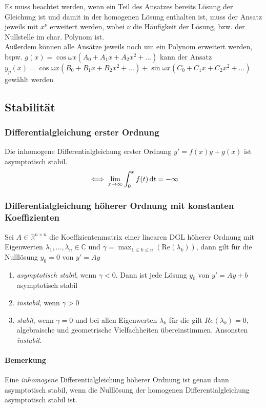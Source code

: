 Es muss beachtet werden, wenn ein Teil des Ansatzes bereits Lösung der Gleichung ist und damit in der homogenen Lösung enthalten ist, muss der Ansatz jeweils mit $x^\nu$ erweitert werden, wobei $\nu$ die Häufigkeit der Lösung, bzw. der Nullstelle im char. Polynom ist.\\
Außerdem können alle Ansätze jeweils noch um ein Polynom erweitert werden, bspw. $g(x)=\cos{\omega x}(A_0+A_1x+A_2x^2+\dots)$ kann der Ansatz\\ $y_p(x)=\cos{\omega x}(B_0+B_1x+B_2x^2+\dots)+\sin{\omega x}(C_0+C_1x+C_2x^2+\dots)$ gewählt werden

\subsection{Stabilität}
\subsubsection{Differentialgleichung erster Ordnung}
Die inhomogene Differentialgleichung erster Ordnung $y'= f(x)y+g(x)$ ist asymptotisch stabil.\\
$$\iff \lim_{x\rightarrow \infty} \int^{x}_0 f(t) \mathop{}\!\mathrm{d} t = -\infty$$
\subsubsection{Differentialgleichung höherer Ordnung mit konstanten Koeffizienten}
Sei $A \in \mathbb{R}^{n\times n}$ die Koeffizientenmatrix einer linearen DGL höherer Ordnung mit Eigenwerten $\lambda_1,\dots, \lambda_n \in \mathbb{C}$ und $\gamma = \max_{1\leq k\leq n}(\text{Re}(\lambda_k))$, dann gilt für die Nulllösung $y_0=0$ von $y'=Ay$
\begin{enumerate}[label=\roman*)]
    \item \emph{asymptotisch stabil}, wenn $\gamma < 0$. Dann ist jede Lösung $y_0$ von $y'=Ay + b$ asymptotisch stabil
    \item \emph{instabil}, wenn $\gamma > 0$
    \item \emph{stabil}, wenn $\gamma = 0$ und bei allen Eigenwerten $\lambda_k$ für die gilt $Re(\lambda_k)=0$, algebraische und geometrische Vielfachheiten übereinstimmen. Ansonsten \emph{instabil}.
\end{enumerate}

\paragraph{Bemerkung}
Eine \textit{inhomogene} Differentialgleichung höherer Ordnung ist genau dann asymptotisch stabil, wenn die Nulllösung der homogenen Differentialgleichung asymptotisch stabil ist.

